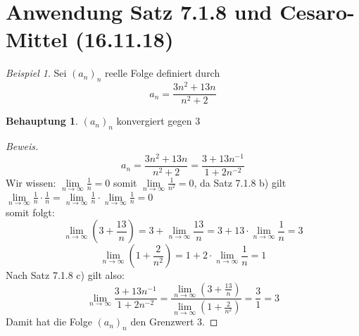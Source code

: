 \documentclass[12pt,a4paper,titlepage]{article} %
\theoremstyle{definition}
\newtheorem*{beh}{Behauptung}
\theoremstyle{remark}
\newtheorem*{bsp}{Beispiel}
\newenvironment{bew}{\begin{proof}[Beweis]}{\end{proof}}
\newcommand{\limes}[1]{\lim\limits_{#1\rightarrow\infty}}
\begin{document}
	\section{Anwendung Satz 7.1.8 und Cesaro-Mittel (16.11.18)}
	\begin{bsp}
		Sei \((a_n)_n\) reelle Folge definiert durch
		\[a_n = \frac{3n^2+13n}{n^2+2}\]
		\begin{beh}
			\((a_n)_n\) konvergiert gegen \(3\)
		\end{beh}
		\begin{bew}
			\[a_n = \frac{3n^2+13n}{n^2+2} = \frac{3 + 13n^{-1}}{1 + 2n^{-2}}\]
			Wir wissen: \(\limes{n} \frac{1}{n} = 0\) somit \(\limes{n} \frac{1}{n^2} = 0\), da Satz 7.1.8 b) gilt\\
			\(\limes{n} \frac{1}{n} \cdot \frac{1}{n} = \limes{n} \frac{1}{n} \cdot \limes{n} \frac{1}{n} = 0\)\\
			somit folgt:
			\[\limes{n} \left(3+\frac{13}{n}\right) = 3 + \limes{n} \frac{13}{n} = 3 + 13 \cdot \limes{n} \frac{1}{n} = 3\]
			\[\limes{n} \left(1 + \frac{2}{n^2}\right) = 1 + 2 \cdot \limes{n} \frac{1}{n} = 1\]
			Nach Satz 7.1.8 c) gilt also:
			\[\limes{n} \frac{3 + 13n^{-1}}{1 + 2n^{-2}} = \frac{\limes{n} \left(3+\frac{13}{n}\right)}{\limes{n} \left(1 + \frac{2}{n^2}\right)} = \frac{3}{1} = 3\]
			Damit hat die Folge \((a_n)_n\) den Grenzwert 3.
		\end{bew}
	\end{bsp}
\end{document}
